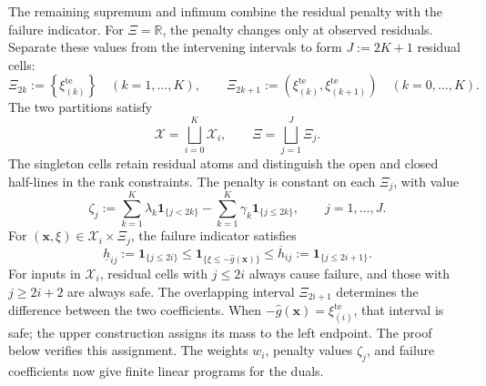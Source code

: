 \documentclass[review,11pt,3p,authoryear,nopreprintline]{elsarticle}
\begin{document}
The remaining supremum and infimum combine the residual penalty with the failure indicator. For $\Xi=\mathbb R$, the penalty changes only at observed residuals. Separate these values from the intervening intervals to form $J:=2K+1$ residual cells:
\begin{equation*}
  \Xi_{2k}:=\left\{\xi_{(k)}^{\mathrm{te}}\right\}
    \quad\left(k=1,\ldots,K\right),
  \qquad
  \Xi_{2k+1}:=\left(\xi_{(k)}^{\mathrm{te}},\xi_{(k+1)}^{\mathrm{te}}\right)
    \quad\left(k=0,\ldots,K\right).
\end{equation*}
The two partitions satisfy
\begin{equation*}
  \mathcal X=\bigsqcup_{i=0}^K\mathcal X_i,
  \qquad
  \Xi=\bigsqcup_{j=1}^J\Xi_j.
\end{equation*}
The singleton cells retain residual atoms and distinguish the open and closed half-lines in the rank constraints. The penalty is constant on each $\Xi_j$, with value
\begin{equation*}
  \zeta_j:=\sum_{k=1}^K\lambda_k\mathbf1_{\{j<2k\}}
    -\sum_{k=1}^K\gamma_k\mathbf1_{\{j\le2k\}},
    \qquad j=1,\ldots,J.
\end{equation*}
For $(\bm x,\xi)\in\mathcal X_i\times\Xi_j$, the failure indicator satisfies
\begin{equation}
  \underline h_{ij}:=\mathbf1_{\{j\le2i\}}
  \le\mathbf1_{\{\xi\le-\hat g(\bm x)\}}
  \le\overline h_{ij}:=\mathbf1_{\{j\le2i+1\}}.
  \label{eq-cell-costs}
\end{equation}
For inputs in $\mathcal X_i$, residual cells with $j\le2i$ always cause failure, and those with $j\ge2i+2$ are always safe. The overlapping interval $\Xi_{2i+1}$ determines the difference between the two coefficients. When $-\hat g(\bm x)=\xi_{(i)}^{\mathrm{te}}$, that interval is safe; the upper construction assigns its mass to the left endpoint. The proof below verifies this assignment. The weights $w_i$, penalty values $\zeta_j$, and failure coefficients now give finite linear programs for the duals.
\end{document}
